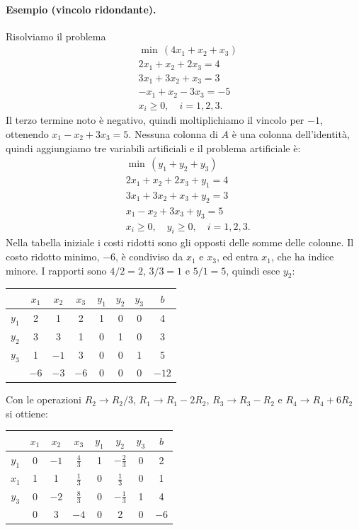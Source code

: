 \paragraph{Esempio (vincolo ridondante).}
Risolviamo il problema
\[
\begin{aligned}
&\min\, (4x_1 + x_2 + x_3) \\
&2x_1 + x_2 + 2x_3 = 4 \\
&3x_1 + 3x_2 + x_3 = 3 \\
&{-x_1} + x_2 - 3x_3 = -5 \\
&x_i \ge 0, \quad i = 1, 2, 3.
\end{aligned}
\]
Il terzo termine noto è negativo, quindi moltiplichiamo il vincolo per $-1$, ottenendo $x_1 - x_2 + 3x_3 = 5$. Nessuna colonna di $A$ è una colonna dell'identità, quindi aggiungiamo tre variabili artificiali e il problema artificiale è:
\[
\begin{aligned}
&\min\, (y_1 + y_2 + y_3) \\
&2x_1 + x_2 + 2x_3 + y_1 = 4 \\
&3x_1 + 3x_2 + x_3 + y_2 = 3 \\
&x_1 - x_2 + 3x_3 + y_3 = 5 \\
&x_i \ge 0, \quad y_i \ge 0, \quad i = 1, 2, 3.
\end{aligned}
\]
Nella tabella iniziale i costi ridotti sono gli opposti delle somme delle colonne. Il costo ridotto minimo, $-6$, è condiviso da $x_1$ e $x_3$, ed entra $x_1$, che ha indice minore. I rapporti sono $4/2 = 2$, $3/3 = 1$ e $5/1 = 5$, quindi esce $y_2$:
\begin{center}
\begin{tabular}{c|cccccc|c}
 & $x_1$ & $x_2$ & $x_3$ & $y_1$ & $y_2$ & $y_3$ & $b$ \\
\hline
$y_1$ & 2 & 1 & 2 & 1 & 0 & 0 & 4 \\
$y_2$ & $\boxed{3}$ & 3 & 1 & 0 & 1 & 0 & 3 \\
$y_3$ & 1 & $-1$ & 3 & 0 & 0 & 1 & 5 \\
\hline
 & $-6$ & $-3$ & $-6$ & 0 & 0 & 0 & $-12$ \\
\end{tabular}
\end{center}
Con le operazioni $R_2 \to R_2/3$, $R_1 \to R_1 - 2R_2$, $R_3 \to R_3 - R_2$ e $R_4 \to R_4 + 6R_2$ si ottiene:
\begin{center}
\begin{tabular}{c|cccccc|c}
 & $x_1$ & $x_2$ & $x_3$ & $y_1$ & $y_2$ & $y_3$ & $b$ \\
\hline
$y_1$ & 0 & $-1$ & $\boxed{\tfrac43}$ & 1 & $-\frac23$ & 0 & 2 \\
$x_1$ & 1 & 1 & $\frac13$ & 0 & $\frac13$ & 0 & 1 \\
$y_3$ & 0 & $-2$ & $\frac83$ & 0 & $-\frac13$ & 1 & 4 \\
\hline
 & 0 & 3 & $-4$ & 0 & 2 & 0 & $-6$ \\
\end{tabular}
\end{center}
